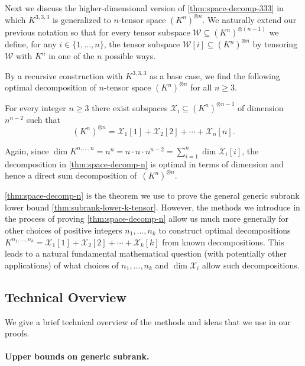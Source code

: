 \documentclass[10pt,a4paper]{article}
\theoremstyle{definition}
\theoremstyle{remark}
\begin{document}
Next we discuss the higher-dimensional version of \autoref{thm:space-decomp-333} in which $K^{3,3,3}$ is generalized to $n$-tensor space $(K^n)^{\otimes n}$. We naturally extend our previous notation so that for every tensor subspace $\mathcal{W} \subseteq (K^n)^{\otimes (n-1)}$ we define, for any $i \in \{1, \ldots, n\}$, the tensor subspace $\mathcal{W}[i] \subseteq (K^n)^{\otimes n}$ by tensoring $\mathcal{W}$ with $K^n$ in one of the $n$ possible ways. 

By a recursive construction with $K^{3,3,3}$ as a base case, we find the following optimal decomposition of $n$-tensor space $(K^n)^{\otimes n}$ for all $n\geq3$.

\begin{theorem}\label{thm:space-decomp-n}
For every integer $n\geq 3$ there exist subspaces $\mathcal{X}_i \subseteq (K^n)^{\otimes n-1}$ of dimension~$n^{n-2}$ such that
\[
(K^n)^{\otimes n} = \mathcal{X}_1[1] + \mathcal{X}_2[2] + \cdots + \mathcal{X}_n[n].
\]
\end{theorem}
Again, since $\dim K^{n,\ldots, n} = n^n = n \cdot n\cdot n^{n-2} = \sum_{i=1}^n \dim \mathcal{X}_i[i]$, the decomposition in \autoref{thm:space-decomp-n} is optimal in terms of dimension and hence a direct sum decomposition of~$(K^n)^{\otimes n}$.

\autoref{thm:space-decomp-n} is the theorem we use to prove the general generic subrank lower bound \autoref{thm:subrank-lower-k-tensor}. However, the methods we introduce in the process of proving \autoref{thm:space-decomp-n} allow us much more generally for other choices of positive integers $n_1, \ldots, n_k$ to construct optimal decompositions $K^{n_1, \ldots, n_k} = \mathcal{X}_1[1] + \mathcal{X}_2[2] + \cdots + \mathcal{X}_k[k]$ from known decompositions. This leads to a natural fundamental mathematical question (with potentially other applications) of what choices of $n_1, \ldots, n_k$ and $\dim \mathcal{X}_i$ allow such decompositions.


\subsection{Technical Overview}\label{subsec:tech}

We give a brief technical overview of the methods and ideas that we use in our proofs. 

\paragraph{Upper bounds on generic subrank.}
\end{document}
